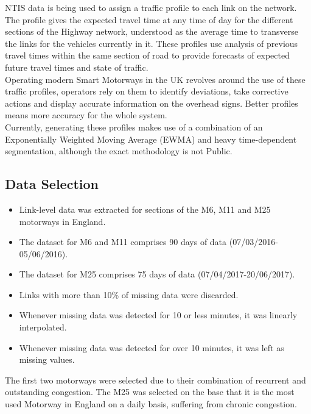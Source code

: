 \documentclass[conference]{IEEEtran}
\begin{document}
NTIS data is being used to assign a traffic profile to each link on the network. 
The profile gives the expected travel time at any time of day for the different sections of the Highway network, understood as the average time to transverse the links for the vehicles currently in it. 
These profiles use analysis of previous travel times within the same section of road to provide forecasts of expected future travel times and state of traffic.\\

Operating modern Smart Motorways in the UK revolves around the use of these traffic profiles, operators rely on them to identify deviations, take corrective actions and display accurate information on the overhead signs. 
Better profiles means more accuracy for the whole system.\\

Currently, generating these profiles makes use of a combination of an Exponentially Weighted Moving Average (EWMA) and heavy time-dependent segmentation, although the exact methodology is not Public. 


\subsection{Data Selection}
\begin{itemize}
	\item Link-level data was extracted for sections of the M6, M11 and M25 motorways in England.
	\item The dataset for M6 and M11 comprises 90 days of data (07/03/2016-05/06/2016).
	\item The dataset for M25 comprises 75 days of data (07/04/2017-20/06/2017).
	\item Links with more than 10\% of missing data were discarded.
	\item Whenever missing data was detected for 10 or less minutes, it was linearly interpolated.
	\item Whenever missing data was detected for over 10 minutes, it was left as missing values.
\end{itemize}
The first two motorways were selected due to their combination of recurrent and outstanding congestion. 
The M25 was selected on the base that it is the most used Motorway in England on a daily basis, suffering from chronic congestion.
\end{document}
